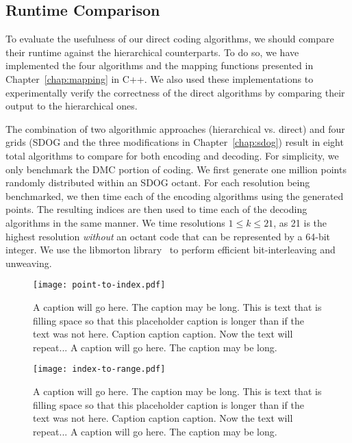 \subsection{Runtime Comparison}
To evaluate the usefulness of our direct coding algorithms, we should compare their runtime against the hierarchical counterparts.
To do so, we have implemented the four algorithms and the mapping functions presented in Chapter~\ref{chap:mapping} in C++.
We also used these implementations to experimentally verify the correctness of the direct algorithms by comparing their output to the hierarchical ones.


The combination of two algorithmic approaches (hierarchical vs. direct) and four grids (SDOG and the three modifications in Chapter~\ref{chap:sdog}) result in eight total algorithms to compare for both encoding and decoding.
For simplicity, we only benchmark the DMC portion of coding.
We first generate one million points randomly distributed within an SDOG octant.
For each resolution being benchmarked, we then time each of the encoding algorithms using the generated points.
The resulting indices are then used to time each of the decoding algorithms in the same manner.
We time resolutions $1 \le k \le 21$, as 21 is the highest resolution \textit{without} an octant code that can be represented by a 64-bit integer.
We use the libmorton library~\cite{libmorton} to perform efficient bit-interleaving and unweaving.


\begin{figure}[htp!]
	\centering
	\texttt{[image: point-to-index.pdf]}
	\caption[Runtime comparison of SDOG point encoding algorithms]{
		A caption will go here.
		The caption may be long.
		This is text that is filling space so that this placeholder caption is longer than if the text was not here.
		Caption caption caption.
		Now the text will repeat...
		A caption will go here.
		The caption may be long.
	}
	\label{fig:point-to-index}
\end{figure}


\begin{figure}[htp!]
	\centering
	\texttt{[image: index-to-range.pdf]}
	\caption[Runtime comparison of SDOG decoding algorithms]{
		A caption will go here.
		The caption may be long.
		This is text that is filling space so that this placeholder caption is longer than if the text was not here.
		Caption caption caption.
		Now the text will repeat...
		A caption will go here.
		The caption may be long.
	}
	\label{fig:index-to-range}
\end{figure}



